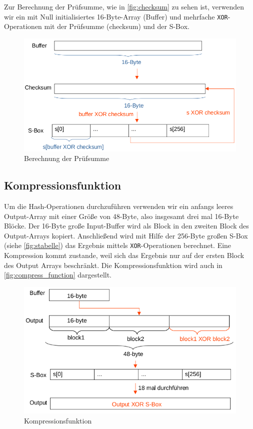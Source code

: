 \documentclass[course=erap]{aspdoc}
\begin{document}
Zur Berechnung der Prüfsumme, wie in \autoref{fig:checksum} zu sehen ist, verwenden wir ein mit Null initialisiertes 16-Byte-Array (Buffer) und mehrfache \texttt{XOR}-Operationen mit der Prüfsumme (checksum) und der S-Box.

\begin{figure}[H]
    \centering
    \includegraphics[width=\textwidth]{Figures/checksum.png}
    \caption{Berechnung der Prüfsumme}
    \label{fig:checksum}
\end{figure}


\subsection{Kompressionsfunktion}

Um die Hash-Operationen durchzuführen verwenden wir ein anfangs leeres Output-Array mit einer Größe von 48-Byte, also insgesamt drei mal 16-Byte Blöcke. Der 16-Byte große Input-Buffer wird als Block in den zweiten Block des Output-Arrays kopiert. Anschließend wird mit Hilfe der 256-Byte großen S-Box (siehe \autoref{fig:stabelle}) das Ergebnis mittels \texttt{XOR}-Operationen berechnet. Eine Kompression kommt zustande, weil sich das Ergebnis nur auf der ersten Block des Output Arrays beschränkt. Die Kompressionsfunktion wird auch in \autoref{fig:compress_function} dargestellt. 

\begin{figure}[H]
    \centering
    \includegraphics[width=\textwidth]{Figures/compression_function.png}
    \caption{Kompressionsfunktion}
    \label{fig:compress_function}
\end{figure}
\end{document}
